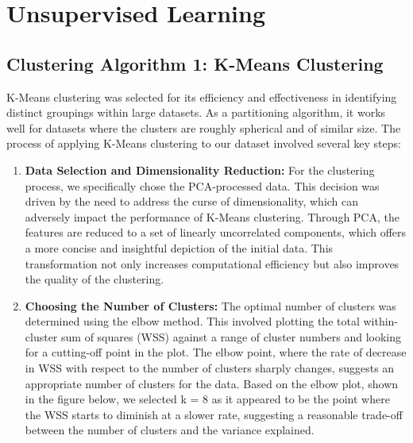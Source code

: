 \documentclass[8pt]{article}
\begin{document}
\section{Unsupervised Learning}

\subsection{Clustering Algorithm 1: K-Means Clustering}
K-Means clustering was selected for its efficiency and effectiveness in identifying distinct groupings within large datasets. As a partitioning algorithm, it works well for datasets where the clusters are roughly spherical and of similar size. 
The process of applying K-Means clustering to our dataset involved several key steps:

\begin{enumerate}
    \item \textbf{Data Selection and Dimensionality Reduction:} For the clustering process, we specifically chose the PCA-processed data. This decision was driven by the need to address the curse of dimensionality, which can adversely impact the performance of K-Means clustering. Through PCA, the features are reduced to a set of linearly uncorrelated components, which offers a more concise and insightful depiction of the initial data. This transformation not only increases computational efficiency but also improves the quality of the clustering. 
    
    \item \textbf{Choosing the Number of Clusters:} The optimal number of clusters was determined using the elbow method. This involved plotting the total within-cluster sum of squares (WSS) against a range of cluster numbers and looking for a cutting-off point in the plot. The elbow point, where the rate of decrease in WSS with respect to the number of clusters sharply changes, suggests an appropriate number of clusters for the data. Based on the elbow plot, shown in the figure below, we selected k = 8 as it appeared to be the point where the WSS starts to diminish at a slower rate, suggesting a reasonable trade-off between the number of clusters and the variance explained.


\end{enumerate}
\end{document}
